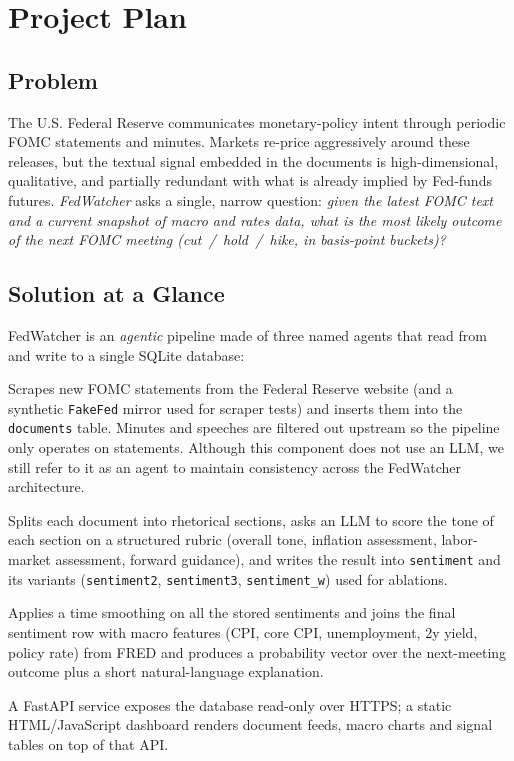 \section{Project Plan}

\subsection{Problem}
The U.S. Federal Reserve communicates monetary-policy intent through periodic FOMC statements and minutes. Markets re-price aggressively around these releases, but the textual signal embedded in the documents is high-dimensional, qualitative, and partially redundant with what is already implied by Fed-funds futures. \emph{FedWatcher} asks a single, narrow question: \emph{given the latest FOMC text and a current snapshot of macro and rates data, what is the most likely outcome of the next FOMC meeting (cut~/~hold~/~hike, in basis-point buckets)?}

\subsection{Solution at a Glance}
FedWatcher is an \emph{agentic} pipeline made of three named agents that read from and write to a single SQLite database:
\begin{description}[leftmargin=1.2em,style=nextline,itemsep=0pt]
  \item[MonitorAgent] Scrapes new FOMC statements from the Federal Reserve website (and a synthetic \texttt{FakeFed} mirror used for scraper tests) and inserts them into the \texttt{documents} table. Minutes and speeches are filtered out upstream so the pipeline only operates on statements. Although this component does not use an LLM, we still refer to it as an agent to maintain consistency across the FedWatcher architecture.
  \item[AnalystAgent] Splits each document into rhetorical sections, asks an LLM to score the tone of each section on a structured rubric (overall tone, inflation assessment, labor-market assessment, forward guidance), and writes the result into \texttt{sentiment} and its variants (\texttt{sentiment2}, \texttt{sentiment3}, \texttt{sentiment\_w}) used for ablations.
  \item[StrategistAgent] Applies a time smoothing on all the stored sentiments and joins the final sentiment row with macro features (CPI, core CPI, unemployment, 2y yield, policy rate) from FRED and produces a probability vector over the next-meeting outcome plus a short natural-language explanation.
\end{description}
A FastAPI service exposes the database read-only over HTTPS; a static HTML/JavaScript dashboard renders document feeds, macro charts and signal tables on top of that API.

